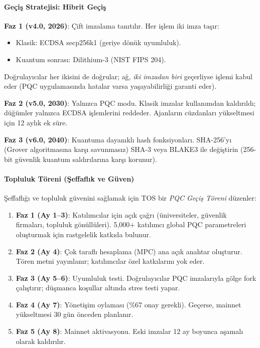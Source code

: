 \documentclass[11pt]{article}
\begin{document}
\paragraph{Geçiş Stratejisi: Hibrit Geçiş}
\textbf{Faz 1 (v4.0, 2026)}: Çift imzalama tanıtılır. Her işlem iki imza taşır:
\begin{itemize}[noitemsep]
  \item Klasik: ECDSA secp256k1 (geriye dönük uyumluluk).
  \item Kuantum sonrası: Dilithium-3 (NIST FIPS 204).
\end{itemize}
Doğrulayıcılar her ikisini de doğrular; ağ, \emph{iki imzadan biri} geçerliyse işlemi kabul eder (PQC uygulamasında hatalar varsa yaşayabilirliği garanti eder).

\textbf{Faz 2 (v5.0, 2030)}: Yalnızca PQC modu. Klasik imzalar kullanımdan kaldırıldı; düğümler yalnızca ECDSA işlemlerini reddeder. Ajanların cüzdanları yükseltmesi için 12 aylık ek süre.

\textbf{Faz 3 (v6.0, 2040)}: Kuantuma dayanıklı hash fonksiyonları. SHA-256'yı (Grover algoritmasına karşı savunmasız) SHA-3 veya BLAKE3 ile değiştirin (256-bit güvenlik kuantum saldırılarına karşı korunur).

\paragraph{Topluluk Töreni (Şeffaflık ve Güven)}
Şeffaflığı ve topluluk güvenini sağlamak için TOS bir \emph{PQC Geçiş Töreni} düzenler:
\begin{enumerate}[noitemsep]
  \item \textbf{Faz 1 (Ay 1--3)}: Katılımcılar için açık çağrı (üniversiteler, güvenlik firmaları, topluluk gönüllüleri). 5,000+ katılımcı global PQC parametreleri oluşturmak için rastgelelik katkıda bulunur.
  \item \textbf{Faz 2 (Ay 4)}: Çok taraflı hesaplama (MPC) ana açık anahtar oluşturur. Tören metni yayınlanır; katılımcılar özel katkılarını yok eder.
  \item \textbf{Faz 3 (Ay 5--6)}: Uyumluluk testi. Doğrulayıcılar PQC imzalarıyla gölge fork çalıştırır; düşmanca koşullar altında stres testi yapar.
  \item \textbf{Faz 4 (Ay 7)}: Yönetişim oylaması (\%67 onay gerekli). Geçerse, mainnet yükseltmesi 30 gün önceden planlanır.
  \item \textbf{Faz 5 (Ay 8)}: Mainnet aktivasyonu. Eski imzalar 12 ay boyunca aşamalı olarak kaldırılır.
\end{enumerate}
\end{document}
